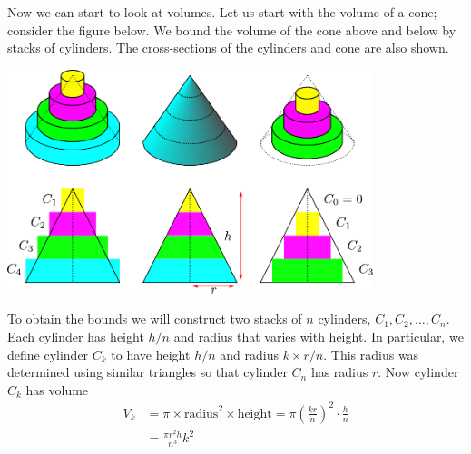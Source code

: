 Now we can start to look at volumes. Let us start with the volume of a cone; consider the
figure below. We bound the volume of the cone above and below by stacks of cylinders. The
cross-sections of the cylinders and cone are also shown.
\begin{center}
 \includegraphics[width=0.8\textwidth]{cone}
\end{center}
To obtain the bounds we will construct two stacks of $n$ cylinders, $C_1,C_2,\dots,C_n$.
Each cylinder has height $h/n$ and radius that varies with height. In particular, we
define cylinder $C_k$ to have height $h/n$ and radius $k \times r/n$. This radius was
determined using similar triangles so that cylinder $C_n$ has radius $r$. Now cylinder
$C_k$ has volume
\begin{align*}
  V_k &= \pi \times \text{radius}^2 \times \text{height}
  = \pi \left( \frac{kr}{n} \right)^2 \cdot \frac{h}{n}\\
  &= \frac{\pi r^2h}{n^3} k^2
\end{align*}

